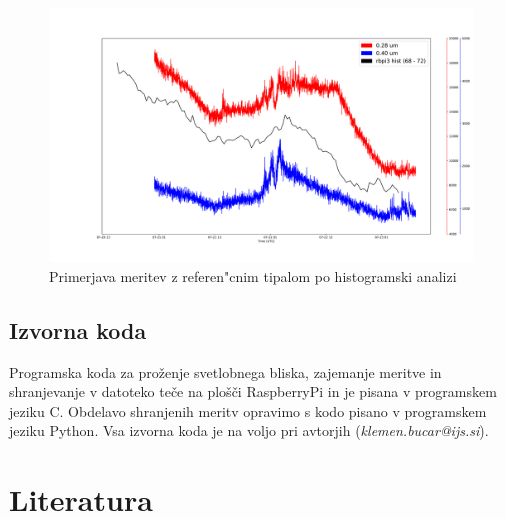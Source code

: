 \documentclass[12pt,a4paper]{article}
\begin{document}
\begin{figure}[H]
	\begin{center}
		\includegraphics[width=16cm]{hist_comparison.pdf}
		\caption{Primerjava meritev z referen"cnim tipalom po histogramski analizi}
		\label{hist_comparison}
	\end{center}
\end{figure}

\clearpage

\begin{appendices}
	\section{Izvorna koda}

Programska koda za proženje svetlobnega bliska, zajemanje meritve in shranjevanje v datoteko teče na plošči RaspberryPi in je pisana v programskem jeziku C.
Obdelavo shranjenih meritv opravimo s kodo pisano v programskem jeziku Python. 
Vsa izvorna koda je na voljo pri avtorjih (\emph{klemen.bucar@ijs.si}).


\end{appendices}
\clearpage

\section{Literatura}


\printbibliography[heading=none]
\end{document}
